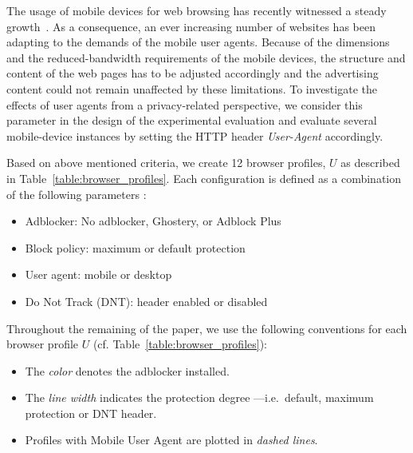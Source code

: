 \documentclass[compsoc, conference, letterpaper, 10pt, times]{IEEEtran}
\begin{document}
The usage of mobile devices for web browsing has recently witnessed a steady growth~\cite{mobile_usage}. As a consequence, an ever increasing number of websites has been adapting to the demands of the mobile user agents. Because of the dimensions and the reduced-bandwidth requirements of the mobile devices, the structure and content of the web pages has to be adjusted accordingly and the advertising content could not remain unaffected by these limitations. To investigate the effects of user agents from a privacy-related perspective, we consider this parameter in the design of the experimental evaluation and evaluate several mobile-device instances by setting the HTTP header \textit{User-Agent} accordingly.

Based on above mentioned criteria, we create 12 browser profiles, $U$ as described in Table~\ref{table:browser_profiles}. Each configuration is defined as a combination of the following parameters :
\begin{itemize}
 \item Adblocker: No adblocker, Ghostery, or Adblock Plus
 \item Block policy: maximum or default protection
 \item User agent: mobile or desktop 
 \item Do Not Track (DNT): header enabled or disabled
\end{itemize}
Throughout the remaining of the paper, we use the following conventions for each browser profile $U$ (cf. Table~\ref{table:browser_profiles}):
\begin{itemize}
 \item The \textit{color} denotes the adblocker installed.
 \item The \textit{line width} indicates the protection degree ---i.e.\ default, maximum protection or DNT header.
 \item Profiles with Mobile User Agent are plotted in \textit{dashed lines}.
\end{itemize}
\end{document}
